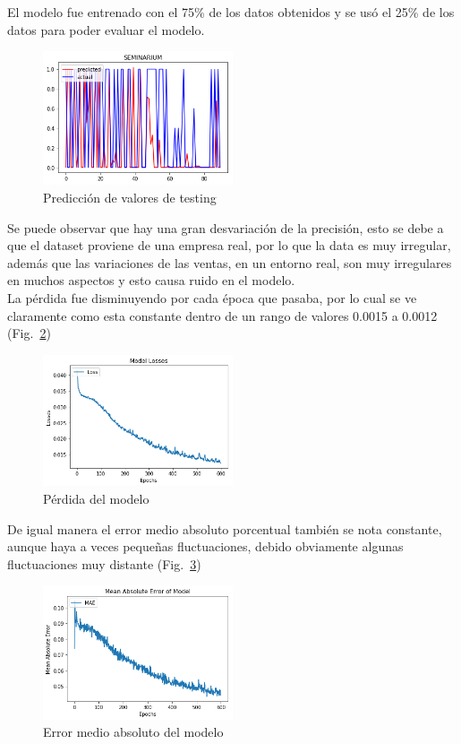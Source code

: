\documentclass[conference]{IEEEtran}
\begin{document}
El modelo fue entrenado con el 75\% de los datos obtenidos y se usó el 25\% de los datos para poder evaluar el modelo.
\begin{figure}[H]
    \centering
    \includegraphics[width=0.5\textwidth]{metricas/prediccion}
    \caption{Predicción de valores de testing}
    \label{fig:prediccion}
\end{figure}
Se puede observar que hay una gran desvariación de la precisión, esto se debe a que el dataset proviene de una empresa real, por lo que la data es muy irregular, además que las variaciones de las ventas, en un entorno real, son muy irregulares en muchos aspectos y esto causa ruido en el modelo.\\
La pérdida fue disminuyendo por cada época que pasaba, por lo cual se ve claramente como esta constante dentro de un rango de valores 0.0015 a 0.0012 (Fig.~\ref{fig:perdida_modelo})
\begin{figure}[H]
    \centering
    \includegraphics[width=0.5\textwidth]{metricas/perdida}
    \caption{Pérdida del modelo}
    \label{fig:perdida_modelo}
\end{figure}
De igual manera el error medio absoluto porcentual también se nota constante, aunque haya a veces pequeñas fluctuaciones, debido obviamente algunas fluctuaciones muy distante (Fig.~\ref{fig:mae_modelo})
\begin{figure}[H]
    \centering
    \includegraphics[width=0.5\textwidth]{metricas/mean_absolute_error}
    \caption{Error medio absoluto del modelo}
    \label{fig:mae_modelo}
\end{figure}
\end{document}
